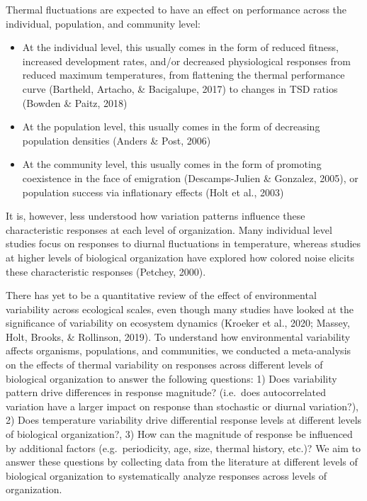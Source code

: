 \documentclass[12pt,twoside]{reedthesis}
\begin{document}
Thermal fluctuations are expected to have an effect on performance across the individual, population, and community level:
\begin{itemize}
\item
  At the individual level, this usually comes in the form of reduced fitness, increased development rates, and/or decreased physiological responses from reduced maximum temperatures, from flattening the thermal performance curve (Bartheld, Artacho, \& Bacigalupe, 2017) to changes in TSD ratios (Bowden \& Paitz, 2018)
\item
  At the population level, this usually comes in the form of decreasing population densities (Anders \& Post, 2006)
\item
  At the community level, this usually comes in the form of promoting coexistence in the face of emigration (Descamps-Julien \& Gonzalez, 2005), or population success via inflationary effects (Holt et al., 2003)
\end{itemize}
It is, however, less understood how variation patterns influence these characteristic responses at each level of organization. Many individual level studies focus on responses to diurnal fluctuations in temperature, whereas studies at higher levels of biological organization have explored how colored noise elicits these characteristic responses (Petchey, 2000).

There has yet to be a quantitative review of the effect of environmental variability across ecological scales, even though many studies have looked at the significance of variability on ecosystem dynamics (Kroeker et al., 2020; Massey, Holt, Brooks, \& Rollinson, 2019). To understand how environmental variability affects organisms, populations, and communities, we conducted a meta-analysis on the effects of thermal variability on responses across different levels of biological organization to answer the following questions: 1) Does variability pattern drive differences in response magnitude? (i.e.~does autocorrelated variation have a larger impact on response than stochastic or diurnal variation?), 2) Does temperature variability drive differential response levels at different levels of biological organization?, 3) How can the magnitude of response be influenced by additional factors (e.g.~periodicity, age, size, thermal history, etc.)? We aim to answer these questions by collecting data from the literature at different levels of biological organization to systematically analyze responses across levels of organization.
\end{document}
